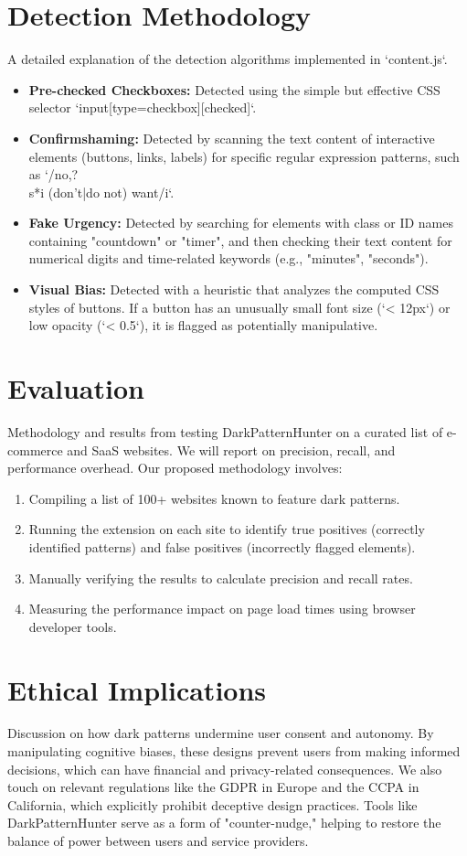 \documentclass[journal]{IEEEtran}
\begin{document}
\section{Detection Methodology}
A detailed explanation of the detection algorithms implemented in `content.js`.
\begin{itemize}
    \item \textbf{Pre-checked Checkboxes:} Detected using the simple but effective CSS selector `input[type=checkbox][checked]`.
    \item \textbf{Confirmshaming:} Detected by scanning the text content of interactive elements (buttons, links, labels) for specific regular expression patterns, such as `/no,?\\s*i (don't|do not) want/i`.
    \item \textbf{Fake Urgency:} Detected by searching for elements with class or ID names containing "countdown" or "timer", and then checking their text content for numerical digits and time-related keywords (e.g., "minutes", "seconds").
    \item \textbf{Visual Bias:} Detected with a heuristic that analyzes the computed CSS styles of buttons. If a button has an unusually small font size (`< 12px`) or low opacity (`< 0.5`), it is flagged as potentially manipulative.
\end{itemize}

\section{Evaluation}
Methodology and results from testing DarkPatternHunter on a curated list of e-commerce and SaaS websites. We will report on precision, recall, and performance overhead. Our proposed methodology involves:
\begin{enumerate}
    \item Compiling a list of 100+ websites known to feature dark patterns.
    \item Running the extension on each site to identify true positives (correctly identified patterns) and false positives (incorrectly flagged elements).
    \item Manually verifying the results to calculate precision and recall rates.
    \item Measuring the performance impact on page load times using browser developer tools.
\end{enumerate}

\section{Ethical Implications}
Discussion on how dark patterns undermine user consent and autonomy. By manipulating cognitive biases, these designs prevent users from making informed decisions, which can have financial and privacy-related consequences. We also touch on relevant regulations like the GDPR in Europe and the CCPA in California, which explicitly prohibit deceptive design practices. Tools like DarkPatternHunter serve as a form of "counter-nudge," helping to restore the balance of power between users and service providers.
\end{document}
